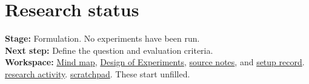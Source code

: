 \section*{Research status}
\textbf{Stage:} Formulation. No experiments have been run.\\
\textbf{Next step:} Define the question and evaluation criteria.\\
\textbf{Workspace:} \href{run:mind-map.json}{Mind map},
\href{run:experiments.json}{Design of Experiments},
\href{run:sources/prior-knowledge.md}{source notes}, and
\href{run:setup/setup.md}{setup record}. \href{run:research-log.md}{research activity}. \href{run:scratchpad.tex}{scratchpad}. These start unfilled.
